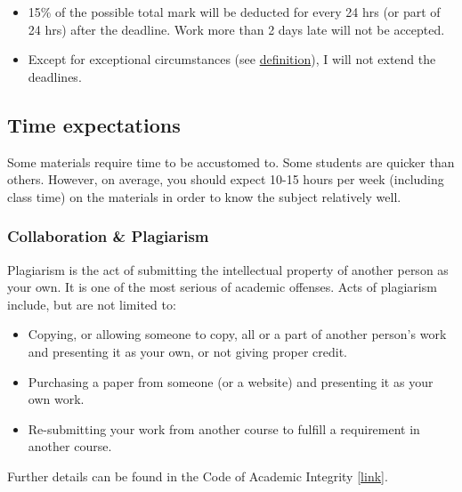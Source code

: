 \documentclass[
]{article}
\providecommand{\tightlist}{%
  \setlength{\itemsep}{0pt}\setlength{\parskip}{0pt}}
\begin{document}
\begin{itemize}
\tightlist
\item
  15\% of the possible total mark will be deducted for every 24 hrs (or part of 24 hrs) after the
  deadline. Work more than 2 days late will not be accepted.
\item
  Except for exceptional circumstances (see \href{https://onestop.fulbright.edu.vn/s/article/Exceptional-Circumstance}{definition}),
  I will not extend the deadlines.
\end{itemize}

\hypertarget{time-expectations}{%
\subsection*{Time expectations}\label{time-expectations}}

Some materials require time to be accustomed to. Some students are quicker than
others. However, on average, you should expect 10-15 hours per week (including class time)
on the materials in order to know the subject relatively well.

\hypertarget{collaboration-plagiarism}{%
\subsubsection*{Collaboration \& Plagiarism}\label{collaboration-plagiarism}}

Plagiarism is the act of submitting the intellectual property of another person as your own. It is one of the most serious of academic offenses. Acts of plagiarism include, but are not limited to:

\begin{itemize}
\item
  Copying, or allowing someone to copy, all or a part of another person's work and presenting it as your own, or not giving proper credit.
\item
  Purchasing a paper from someone (or a website) and presenting it as your own work.
\item
  Re-submitting your work from another course to fulfill a requirement in another course.
\end{itemize}

Further details can be found in the Code of Academic Integrity {[}\href{https://fulbright.edu.vn/articles/Code\%20of\%20Academic\%20Integrity/Code\%20of\%20Academic\%20Integrity_\%20Excom\%20Endorsed.pdf}{link}{]}.
\end{document}
